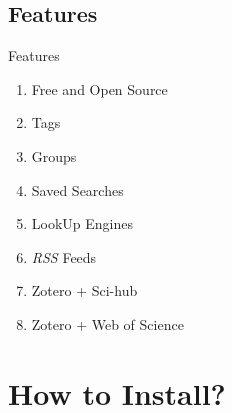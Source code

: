 \documentclass[UTF8]{beamer}
\begin{document}
\subsection{Features}
\begin{frame}{Features}
\begin{enumerate}
\item Free and Open Source
\item Tags
\item Groups
\item Saved Searches
\item LookUp Engines
\item \textit{RSS} Feeds
\item Zotero + Sci-hub
\item Zotero + Web of Science
\end{enumerate}
\end{frame}


\section{How to Install?}

\end{document}
